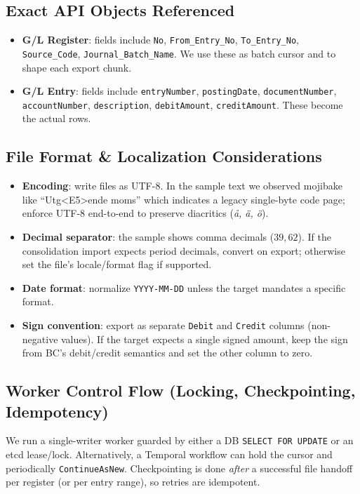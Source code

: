 \documentclass[a4paper,10pt]{article}
\begin{document}
\newpage

\subsection{Exact API Objects Referenced}
\begin{itemize}
  \item \textbf{G/L Register}: fields include \texttt{No}, \texttt{From\_Entry\_No}, \texttt{To\_Entry\_No}, \texttt{Source\_Code}, \texttt{Journal\_Batch\_Name}. We use these as batch cursor and to shape each export chunk.
  \item \textbf{G/L Entry}: fields include \texttt{entryNumber}, \texttt{postingDate}, \texttt{documentNumber}, \texttt{accountNumber}, \texttt{description}, \texttt{debitAmount}, \texttt{creditAmount}. These become the actual rows.
\end{itemize}

\subsection{File Format \& Localization Considerations}

\begin{itemize}
  \item \textbf{Encoding}: write files as UTF-8. In the sample text we observed mojibake like ``Utg\textless E5\textgreater ende moms'' which indicates a legacy single-byte code page; enforce UTF-8 end-to-end to preserve diacritics (\emph{å, ä, ö}). 
  \item \textbf{Decimal separator}: the sample shows comma decimals (\(39,62\)). If the consolidation import expects period decimals, convert on export; otherwise set the file’s locale/format flag if supported.
  \item \textbf{Date format}: normalize \texttt{YYYY-MM-DD} unless the target mandates a specific format.
  \item \textbf{Sign convention}: export as separate \texttt{Debit} and \texttt{Credit} columns (non-negative values). If the target expects a single signed amount, keep the sign from BC’s debit/credit semantics and set the other column to zero.
\end{itemize}

\subsection{Worker Control Flow (Locking, Checkpointing, Idempotency)}

We run a single-writer worker guarded by either a DB \texttt{SELECT FOR UPDATE} or an etcd lease/lock. Alternatively, a Temporal workflow can hold the cursor and periodically \texttt{ContinueAsNew}. Checkpointing is done \emph{after} a successful file handoff per register (or per entry range), so retries are idempotent.
\end{document}
